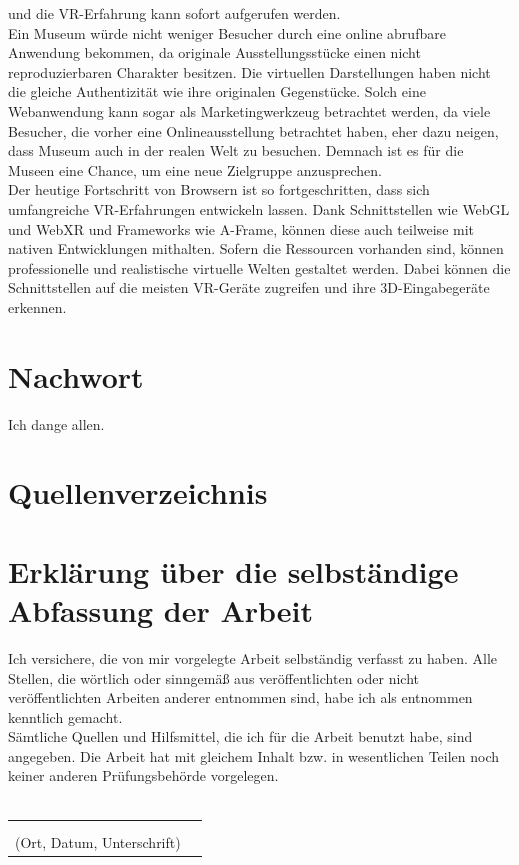\documentclass[a4paper,12pt,oneside]{article}
\begin{document}
    und die VR-Erfahrung kann sofort aufgerufen werden. \\
    Ein Museum würde nicht weniger Besucher durch eine online abrufbare
    Anwendung bekommen, da originale Ausstellungsstücke einen nicht
    reproduzierbaren Charakter besitzen. Die virtuellen Darstellungen
    haben nicht die gleiche Authentizität wie ihre originalen Gegenstücke.
    Solch eine Webanwendung kann sogar als Marketingwerkzeug betrachtet
    werden, da viele Besucher, die vorher eine Onlineausstellung
    betrachtet haben, eher dazu neigen, dass Museum auch in der realen
    Welt zu besuchen. Demnach ist es für die Museen eine Chance, um
    eine neue Zielgruppe anzusprechen. \\
    Der heutige Fortschritt von Browsern ist so fortgeschritten, dass sich
    umfangreiche VR-Erfahrungen entwickeln lassen. Dank Schnittstellen
    wie WebGL und WebXR und Frameworks wie A-Frame, können diese auch
    teilweise mit nativen Entwicklungen mithalten. Sofern die Ressourcen
    vorhanden sind, können professionelle und realistische virtuelle
    Welten gestaltet werden. Dabei können die Schnittstellen auf
    die meisten VR-Geräte zugreifen und ihre 3D-Eingabegeräte erkennen.
  \section{Nachwort}
    Ich dange allen.
  \section{Quellenverzeichnis}
    \printbibliography
  \newpage
  \pagestyle{empty}
  \section*{Erklärung über die selbständige Abfassung der Arbeit}
    Ich versichere, die von mir vorgelegte Arbeit selbständig verfasst zu haben.
    Alle Stellen, die wörtlich oder sinngemäß aus veröffentlichten oder nicht veröffentlichten Arbeiten anderer entnommen sind,
    habe ich als entnommen kenntlich gemacht.\\ 
    Sämtliche Quellen und Hilfsmittel, die ich für die Arbeit benutzt habe, sind
    angegeben. Die Arbeit hat mit gleichem Inhalt bzw. in wesentlichen Teilen noch keiner anderen Prüfungsbehörde vorgelegen.\\\\
    \begin{tabular}{cp{7cm}}
      & \\ 
      & \\ \hline
      \small (Ort, Datum, Unterschrift) & \normalsize \\
    \end{tabular}
  \newpage
  \thispagestyle{empty}
  
\end{document}
